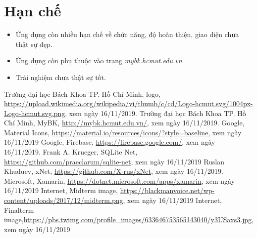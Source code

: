 \documentclass[a4paper]{article}
\begin{document}
\section{Hạn chế}
\begin{itemize}
    \item Ứng dụng còn nhiều hạn chế về chức năng, độ hoàn thiện, giao diện chưa thật sự đẹp.
    \item Ứng dụng còn phụ thuộc vào trang \textit{mybk.hcmut.edu.vn}.
    \item Trải nghiệm chưa thật sự tốt.
\end{itemize}
\newpage
\begin{thebibliography}{}
\bibitem{} Trường đại học Bách Khoa TP. Hồ Chí Minh, logo, \url{https://upload.wikimedia.org/wikipedia/vi/thumb/c/cd/Logo-hcmut.svg/1004px-Logo-hcmut.svg.png}, xem ngày 16/11/2019.
\bibitem{} Trường đại học Bách Khoa TP. Hồ Chí Minh, MyBK, \url{http://mybk.hcmut.edu.vn/}, xem ngày 16/11/2019.
\bibitem{} Google, Material Icons,  \url{https://material.io/resources/icons/?style=baseline}, xem ngày 16/11/2019 
\bibitem{} Google, Firebase, \url{https://firebase.google.com/}, xem ngày 16/11/2019. 
\bibitem{} Frank A. Krueger, SQLite Net, \url{https://github.com/praeclarum/sqlite-net}, xem ngày 16/11/2019
\bibitem{} Ruslan Khuduev, xNet, \url{https://github.com/X-rus/xNet}, xem ngày 16/11/2019.
\bibitem{} Microsoft, Xamarin, \url{https://dotnet.microsoft.com/apps/xamarin}, xem ngày 16/11/2019
\bibitem{} Internet, Midterm image, \url{https://blackmanvoice.net/wp-content/uploads/2017/12/midterm.png}, xem ngày 16/11/2019
\bibitem{} Internet, Finalterm image,\url{https://pbs.twimg.com/profile_images/633646753565143040/y3USaxs3.jpg}, xem ngày 16/11/2019
\end{thebibliography}
\end{document}
